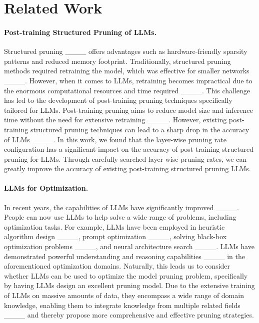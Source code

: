 \section{Related Work}
\label{RelatedWork}
\paragraph{Post-training Structured Pruning of LLMs.}
Structured pruning ____ offers advantages such as hardware-friendly sparsity patterns and reduced memory footprint. Traditionally, structured pruning methods required retraining the model, which was effective for smaller networks ____. However, when it comes to LLMs, retraining becomes impractical due to the enormous computational resources and time required ____. This challenge has led to the development of post-training pruning techniques specifically tailored for LLMs. Post-training pruning aims to reduce model size and inference time without the need for extensive retraining ____. However, existing post-training structured pruning techniques can lead to a sharp drop in the accuracy of LLMs ____. In this work, we found that the layer-wise pruning rate configuration has a significant impact on the accuracy of post-training structured pruning for LLMs. Through carefully searched layer-wise pruning rates, we can greatly improve the accuracy of existing post-training structured pruning LLMs.

\paragraph{LLMs for Optimization.}
In recent years, the capabilities of LLMs have significantly improved ____. People can now use LLMs to help solve a wide range of problems, including optimization tasks. For example, LLMs have been employed in heuristic algorithm design ____, prompt optimization ____, solving black-box optimization problems ____, and neural architecture search ____. LLMs have demonstrated powerful understanding and reasoning capabilities ____ in the aforementioned optimization domains. Naturally, this leads us to consider whether LLMs can be used to optimize the model pruning problem, specifically by having LLMs design an excellent pruning model. Due to the extensive training of LLMs on massive amounts of data, they encompass a wide range of domain knowledge, enabling them to integrate knowledge from multiple related fields ____ and thereby propose more comprehensive and effective pruning strategies.

